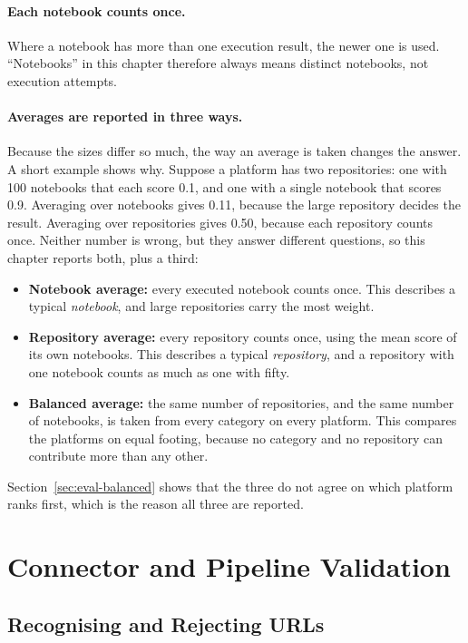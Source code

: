 \paragraph{Each notebook counts once.} Where a notebook has more than one execution result, the newer one is used. ``Notebooks'' in this chapter therefore always means distinct notebooks, not execution attempts.

\paragraph{Averages are reported in three ways.} Because the sizes differ so much, the way an average is taken changes the answer. A short example shows why. Suppose a platform has two repositories: one with 100 notebooks that each score 0.1, and one with a single notebook that scores 0.9. Averaging over notebooks gives 0.11, because the large repository decides the result. Averaging over repositories gives 0.50, because each repository counts once. Neither number is wrong, but they answer different questions, so this chapter reports both, plus a third:

\begin{itemize}[leftmargin=*]
\item \textbf{Notebook average:} every executed notebook counts once. This describes a typical \emph{notebook}, and large repositories carry the most weight.
\item \textbf{Repository average:} every repository counts once, using the mean score of its own notebooks. This describes a typical \emph{repository}, and a repository with one notebook counts as much as one with fifty.
\item \textbf{Balanced average:} the same number of repositories, and the same number of notebooks, is taken from every category on every platform. This compares the platforms on equal footing, because no category and no repository can contribute more than any other.
\end{itemize}

Section~\ref{sec:eval-balanced} shows that the three do not agree on which platform ranks first, which is the reason all three are reported.

\section{Connector and Pipeline Validation}
\label{sec:eval-connectors}

\subsection{Recognising and Rejecting URLs}

